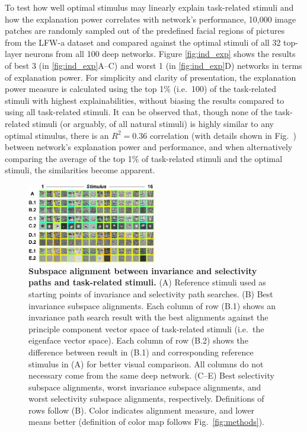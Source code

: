 To test how well optimal stimulus may linearly explain task-related stimuli and how the explanation power correlates with network's performance, 10,000 image patches are randomly sampled out of the predefined facial regions of pictures from the LFW-a dataset \cite{wolf2011effective} and compared against the optimal stimuli of all 32 top-layer neurons from all 100 deep networks. Figure \ref{fig:ind_exp} shows the results of best 3 (in \ref{fig:ind_exp}A--C) and worst 1 (in \ref{fig:ind_exp}D) networks in terms of explanation power. For simplicity and clarity of presentation, the explanation power measure is calculated using the top 1\% (i.e.~100) of the task-related stimuli with highest explainabilities, without biasing the results compared to using all task-related stimuli. It can be observed that, though none of the task-related stimuli (or arguably, of all natural stimuli) is highly similar to any optimal stimulus, there is an $R^2=0.36$ correlation (with details shown in Fig.~\SFexp{}) between network's explanation power and performance, and when alternatively comparing the average of the top 1\% of task-related stimuli and the optimal stimuli, the similarities become apparent. %

\begin{figure}
\centering \includegraphics[width=0.5\textwidth]{Figs/pic3.pdf}
\caption{
{\bf Subspace alignment between invariance and selectivity paths and task-related stimuli.} (A) Reference stimuli used as starting points of invariance and selectivity path searches. (B) Best invariance subspace alignments. Each column of row (B.1) shows an invariance path search result with the best alignments against the principle component vector space of task-related stimuli (i.e.~the eigenface vector space). Each column of row (B.2) shows the difference between result in (B.1) and corresponding reference stimulus in (A) for better visual comparison. All columns do not necessary come from the same deep network. (C--E) Best selectivity subspace alignments, worst invariance subspace alignments, and worst selectivity subspace alignments, respectively. Definitions of rows follow (B). Color indicates alignment measure, and lower means better (definition of color map follows Fig.~\ref{fig:methods}).} %
\label{fig:pop_aln}
\end{figure}

